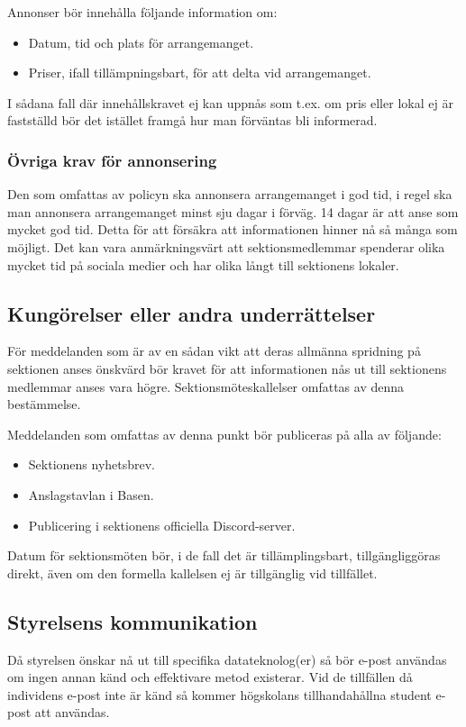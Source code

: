 Annonser bör innehålla följande information om:
\begin{itemize}
    \item Datum, tid och plats för arrangemanget.
    \item Priser, ifall tillämpningsbart, för att delta vid arrangemanget.
\end{itemize}
I sådana fall där innehållskravet ej kan uppnås som t.ex. om pris eller lokal ej är fastställd
bör det istället framgå hur man förväntas bli informerad.

\subsubsection{Övriga krav för annonsering}
Den som omfattas av policyn ska annonsera arrangemanget i god tid, i regel ska man
annonsera arrangemanget minst sju dagar i förväg. 14 dagar är att anse som mycket god
tid. Detta för att försäkra att informationen hinner nå så många som möjligt. Det kan vara
anmärkningsvärt att sektionsmedlemmar spenderar olika mycket tid på sociala medier och
har olika långt till sektionens lokaler.

\subsection{Kungörelser eller andra underrättelser}
För meddelanden som är av en sådan vikt att deras allmänna spridning på sektionen anses
önskvärd bör kravet för att informationen nås ut till sektionens medlemmar anses vara
högre. Sektionsmöteskallelser omfattas av denna bestämmelse.

Meddelanden som omfattas av denna punkt bör publiceras på alla av följande:
\begin{itemize}
    \item Sektionens nyhetsbrev.
    \item Anslagstavlan i Basen.
    \item Publicering i sektionens officiella Discord-server.
\end{itemize}
Datum för sektionsmöten bör, i de fall det är tillämplingsbart, tillgängliggöras direkt, även
om den formella kallelsen ej är tillgänglig vid tillfället.

\subsection{Styrelsens kommunikation}
Då styrelsen önskar nå ut till specifika datateknolog(er) så bör e-post användas om ingen
annan känd och effektivare metod existerar. Vid de tillfällen då individens e-post inte är
känd så kommer högskolans tillhandahållna student e-post att användas.

